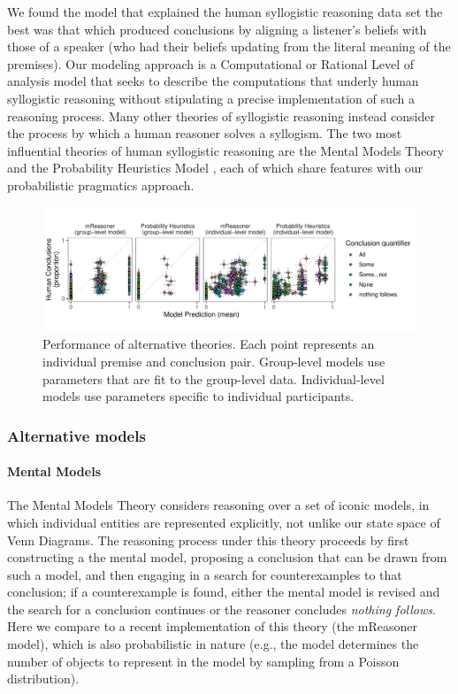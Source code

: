 \documentclass[floatsintext, doc]{apa6}
\begin{document}
We found the model that explained the human syllogistic reasoning data set the best was that which produced conclusions by aligning a listener's beliefs with those of a speaker (who had their beliefs updating from the literal meaning of the premises).
Our modeling approach is a Computational or Rational Level of analysis model \cite{marr1982vision, anderson1990adaptive} that seeks to describe the computations that underly human syllogistic reasoning without stipulating a precise implementation of such a reasoning process. 
Many other theories of syllogistic reasoning instead consider the process by which a human reasoner solves a syllogism.
The two most influential theories of human syllogistic reasoning are the Mental Models Theory \cite{johnsonlaird2006we, khemlani2013processes} and the Probability Heuristics Model \cite{Chater1999}, each of which share features with our probabilistic pragmatics approach. 


\begin{figure}[t]
\centering
\includegraphics[width = \textwidth]{figs/alternative_model_scatters.pdf}
\caption{Performance of alternative theories. Each point represents an individual premise and conclusion pair. Group-level models use parameters that are fit to the group-level data. Individual-level models use parameters specific to individual participants. }
\label{fig:altModels}
\end{figure}

\subsubsection{Alternative models}

\paragraph{Mental Models}

The Mental Models Theory considers reasoning over a set of iconic models, in which individual entities are represented explicitly, not unlike our state space of Venn Diagrams. 
The reasoning process under this theory proceeds by first constructing a the mental model, proposing a conclusion that can be drawn from such a model, and then engaging in a search for counterexamples to that conclusion; if a counterexample is found, either the mental model is revised and the search for a conclusion continues or the reasoner concludes \emph{nothing follows}. 
Here we compare to a recent implementation of this theory (the mReasoner model), which is also probabilistic in nature (e.g., the model determines the number of objects to represent in the model by sampling  from a Poisson distribution). 
\end{document}
